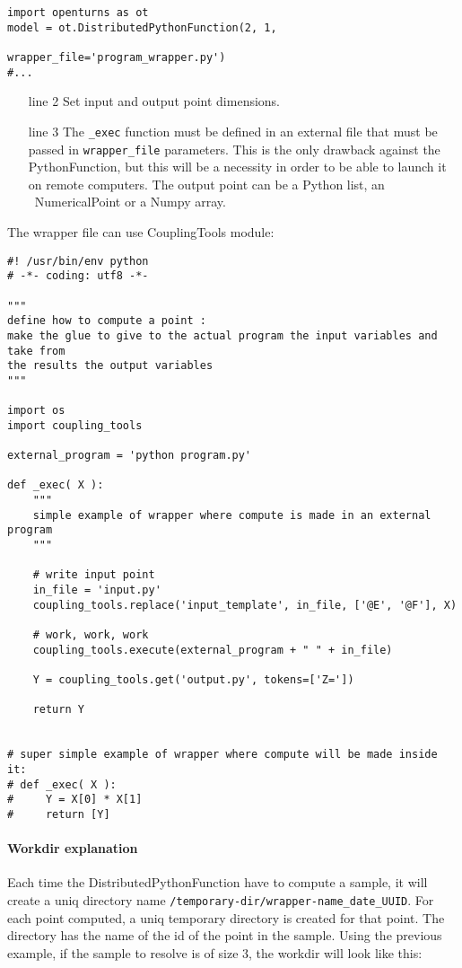 \begin{lstlisting}
import openturns as ot
model = ot.DistributedPythonFunction(2, 1,
                                     wrapper_file='program_wrapper.py')
#...
\end{lstlisting}


\begin{itemize}
  \item[line 2] Set input and output point dimensions.
  \item[line 3] The \verb|_exec| function must be defined in an external file that must be passed in \verb|wrapper_file| parameters. This is the only drawback against the PythonFunction, but this will be a necessity in order to be able to launch it on remote computers. The output point can be a Python list, an \OT\ NumericalPoint or a Numpy array. 
\end{itemize}

The wrapper file can use CouplingTools module:

\begin{lstlisting}
#! /usr/bin/env python
# -*- coding: utf8 -*-

"""
define how to compute a point : 
make the glue to give to the actual program the input variables and take from 
the results the output variables
"""

import os
import coupling_tools

external_program = 'python program.py'

def _exec( X ): 
    """ 
    simple example of wrapper where compute is made in an external program
    """

    # write input point
    in_file = 'input.py'
    coupling_tools.replace('input_template', in_file, ['@E', '@F'], X)

    # work, work, work
    coupling_tools.execute(external_program + " " + in_file)

    Y = coupling_tools.get('output.py', tokens=['Z='])

    return Y


# super simple example of wrapper where compute will be made inside it:
# def _exec( X ): 
#     Y = X[0] * X[1]
#     return [Y]
\end{lstlisting}

\paragraph{Workdir explanation}

Each time the DistributedPythonFunction have to compute a sample, it will create a uniq directory name \verb|/temporary-dir/wrapper-name_date_UUID|. 
For each point computed, a uniq temporary directory is created for that point. The directory has the name of the id of the point in the sample. Using the previous example, if the sample to resolve is of size 3, the workdir will look like this:

